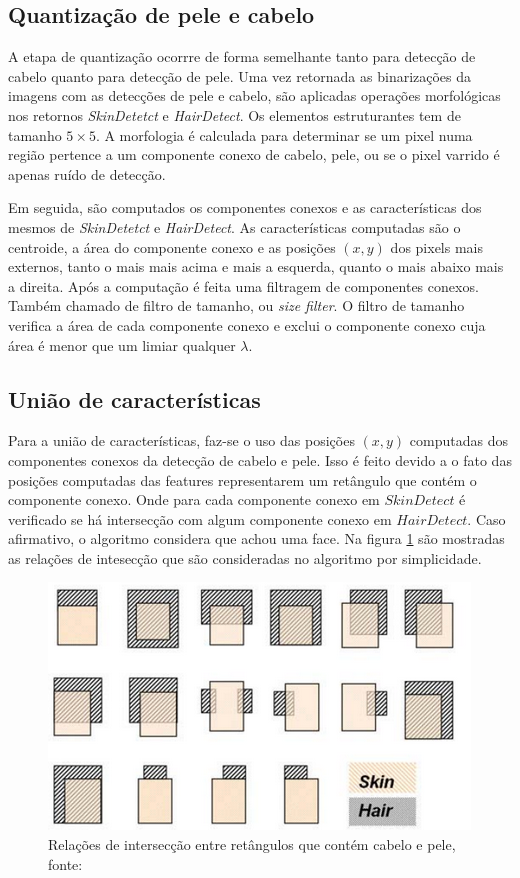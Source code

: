\documentclass[journal,onecolumn]{IEEEtran}
\begin{document}
	\subsection{Quantização de pele e cabelo}
	
	A etapa de quantização ocorrre de forma semelhante tanto para detecção de cabelo quanto para detecção de pele.
	Uma vez retornada as binarizações da imagens com as detecções de pele e cabelo, são aplicadas operações morfológicas nos retornos \textit{SkinDetetct} e \textit{HairDetect}.
 	Os elementos estruturantes tem de tamanho $5\times 5$.
	A morfologia é calculada para determinar se um pixel numa região pertence a um componente conexo de cabelo, pele, ou se o pixel varrido é apenas ruído de detecção.
	
	Em seguida, são computados os componentes conexos e as características dos mesmos de \textit{SkinDetetct} e \textit{HairDetect}.
	As características computadas são o centroide, a área do componente conexo e as posições $(x,y)$ dos pixels mais externos, tanto o mais mais acima e mais a esquerda, quanto o mais abaixo mais a direita.
	Após a computação é feita uma filtragem de componentes conexos.
	Também chamado de filtro de tamanho, ou \textit{size filter}.
	O filtro de tamanho verifica a área de cada componente conexo e exclui o componente conexo cuja área é menor que um limiar qualquer $\lambda$.
	
	\subsection{União de características}	
	
	Para a união de características, faz-se o uso das posições $(x,y)$ computadas dos componentes conexos da detecção de cabelo e pele.
	Isso é feito devido a o fato das posições computadas das features representarem um retângulo que contém o componente conexo.
	Onde para cada componente conexo em $SkinDetect$ é verificado se há intersecção com algum componente conexo em $HairDetect$.
	Caso afirmativo, o algoritmo considera que achou uma face.
	Na figura \ref{fig:intesectRelations} são mostradas as relações de intesecção que são consideradas no algoritmo por simplicidade.
	\begin{figure}[htp]
	\begin{center}
		\includegraphics[scale=0.3]{intersections_skin_hair_components.png}
		\caption{Relações de intersecção entre retângulos que contém cabelo e pele, fonte:\cite{chen2007simple} }			\label{fig:intesectRelations}
	\end{center}
	\end{figure}
	
\end{document}
